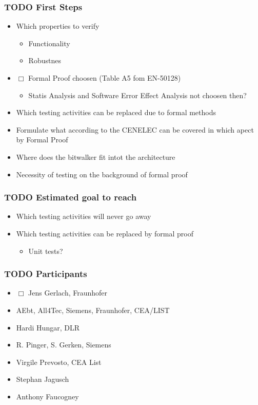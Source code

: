 \documentclass[a4paper,german]{article}
\begin{document}
\subsubsection{\textbf{TODO} First Steps}
\label{sec-1-6-1}

\begin{itemize}
\item Which properties to verify
\begin{itemize}
\item Functionality
\item Robustnes
\end{itemize}
\item $\Box$ Formal Proof choosen (Table A5 fom EN-50128)
\begin{itemize}
\item Statis Analysis and Software Error Effect Analysis not choosen then?
\end{itemize}
\item Which testing activities can be replaced due to formal methods
\item Formulate what according to the CENELEC can be covered in which apect by Formal Proof
\item Where does the bitwalker fit intot the architecture
\item Necessity of testing on the background of formal proof
\end{itemize}
\subsubsection{\textbf{TODO} Estimated goal to reach}
\label{sec-1-6-2}

\begin{itemize}
\item Which testing activities will never go away
\item Which testing activities can be replaced by formal proof
\begin{itemize}
\item Unit tests?
\end{itemize}
\end{itemize}
\subsubsection{\textbf{TODO} Participants}
\label{sec-1-6-3}

\begin{itemize}
\item $\Box$ Jens Gerlach, Fraunhofer
\item AEbt, All4Tec, Siemens, Fraunhofer, CEA/LIST
\item Hardi Hungar, DLR
\item R. Pinger, S. Gerken, Siemens
\item Virgile Prevosto, CEA List
\item Stephan Jagusch
\item Anthony Faucogney
\end{itemize}
\end{document}
